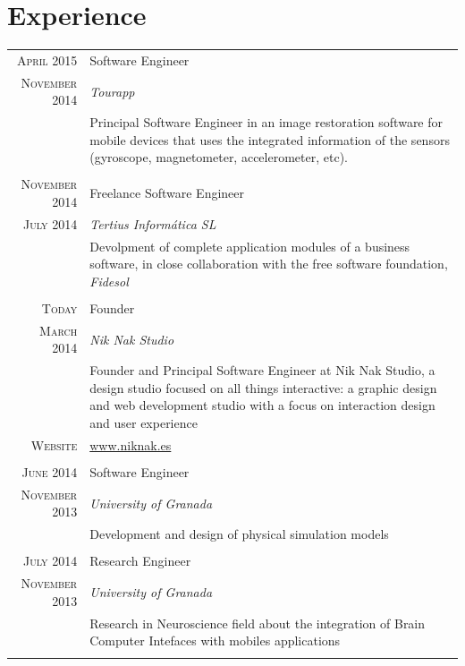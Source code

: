 \documentclass[a4paper,10pt]{article} %
\begin{document}
\section{Experience}

\begin{tabular}{r|p{11cm}}

\textsc{April 2015} & Software Engineer \\
\textsc{November 2014} & \emph{Tourapp}\\
& \footnotesize{Principal Software Engineer in an image restoration software for
mobile devices that uses the integrated information of the sensors
(gyroscope, magnetometer, accelerometer, etc).}  \\
\multicolumn{2}{c}{} \\

\textsc{November 2014} & Freelance Software Engineer \\
\textsc{July 2014} & \emph{Tertius Informática SL}\\
& \footnotesize{Devolpment of complete application modules of a
business software, in close collaboration with the free software foundation,
\textit{Fidesol}}\\
\multicolumn{2}{c}{} \\

\textsc{Today} & Founder \\
\textsc{March 2014} & \emph{Nik Nak Studio}\\
& \footnotesize{Founder and Principal Software Engineer at Nik Nak Studio,  a
design studio focused on all things interactive: a graphic design and web 
development studio with a focus on interaction design and user experience}\\
\textsc{Website} & \url{www.niknak.es} \\
\multicolumn{2}{c}{} \\

\textsc{June 2014} & Software Engineer \\
\textsc{November 2013} & \emph{University of Granada}\\
& \footnotesize{Development and design of physical simulation models}\\
\multicolumn{2}{c}{} \\

\textsc{July 2014} & Research Engineer \\
\textsc{November 2013} & \emph{University of Granada}\\
& \footnotesize{Research in Neuroscience field about the integration of Brain
Computer Intefaces with mobiles applications}\\
\multicolumn{2}{c}{} \\

\end{tabular}
\end{document}
